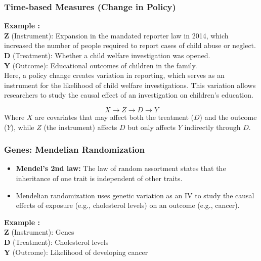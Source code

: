 \subsubsection{Time-based Measures (Change in Policy)}
\textbf{Example :} \\
\textbf{Z} (Instrument): Expansion in the mandated reporter law in 2014, which increased the number of people required to report cases of child abuse or neglect. \\
\textbf{D} (Treatment): Whether a child welfare investigation was opened. \\
\textbf{Y} (Outcome): Educational outcomes of children in the family. \\

Here, a policy change creates variation in reporting, which serves as an instrument for the likelihood of child welfare investigations. This variation allows researchers to study the causal effect of an investigation on children's education.

$$X \rightarrow Z \rightarrow D \rightarrow Y$$
Where $X$ are covariates that may affect both the treatment ($D$) and the outcome ($Y$), while $Z$ (the instrument) affects $D$ but only affects $Y$ indirectly through $D$.

\begin{center}
\end{center}


\subsubsection{Genes: Mendelian Randomization}
\begin{itemize}
    \item \textbf{Mendel's 2nd law:} The law of random assortment states that the inheritance of one trait is independent of other traits.
    \item Mendelian randomization uses genetic variation as an IV to study the causal effects of exposure (e.g., cholesterol levels) on an outcome (e.g., cancer).
\end{itemize}
\textbf{Example :} \\
\textbf{Z} (Instrument): Genes \\
\textbf{D} (Treatment): Cholesterol levels \\
\textbf{Y} (Outcome): Likelihood of developing cancer \\

